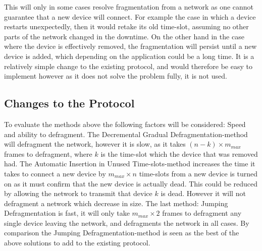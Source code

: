 
\bigskip \noindent
This will only in some cases resolve fragmentation from a network as one cannot guarantee that a new device will connect. 
For example the case in which a device restarts unexpectedly, then it would retake its old time-slot, assuming no other parts of the network changed in the downtime.
On the other hand in the case where the device is effectively removed, the fragmentation will persist until a new device is added, which depending on the application could be a long time.
It is a relatively simple change to the existing protocol, and would therefore be easy to implement however as it does not solve the problem fully, it is not used. 

\subsection{Changes to the Protocol}
To evaluate the methods above the following factors will be considered: Speed and ability to defragment.
The Decremental Gradual Defragmentation-method will defragment the network, however it is slow, as it takes $(n - k) \times m_{max}$ frames to defragment, where $k$ is the time-slot which the device  that was removed had. 
The Automatic Insertion in Unused Time-slots-method increases the time it takes to connect a new device by $m_{max} \times n$ time-slots from a new device is turned on as it must confirm that the new device is actually dead.
This could be reduced by allowing the network to transmit that device $k$ is dead.
However it will not defragment a network which decrease in size. 
The last method: Jumping Defragmentation is fast, it will only take $m_{max} \times 2$ frames to defragment any single device leaving the network, and defragments the network in all cases. 
By comparison the Jumping Defragmentation-method is seen as the best of the above solutions to add to the existing protocol. 